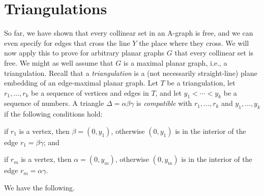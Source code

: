\section{Triangulations}



So far, we have shown that every collinear set in an A-graph is free,
and we can even specify  for edges that cross the line $Y$ the place
where they cross.
We will now apply this to prove for arbitrary planar graphs $G$
that every collinear set is free.
We might as well assume that $G$ is a maximal planar graph, i.e., a triangulation.
Recall that a {\em triangulation} is a (not necessarily straight-line) plane embedding of an edge-maximal planar graph. Let $T$ be a triangulation, let $r_1,\ldots,r_k$ be a sequence of vertices and edges in $T$, and let $y_1<\cdots<y_k$ be a sequence of numbers. A triangle $\Delta=\alpha\beta\gamma$ is \emph{compatible} with $r_1,\ldots,r_k$ and $y_1,\ldots,y_k$ if the following conditions hold:
\begin{compactenum}
	\item if $r_1$ is a vertex, then $\beta=(0,y_1)$, otherwise $(0, y_1)$ is in the interior of the edge $r_1=\beta\gamma$; and
	\item if $r_m$ is a vertex, then $\alpha=(0,y_m)$, otherwise $(0,y_m)$ is in the interior
	of the edge $r_m=\alpha\gamma$.
\end{compactenum}


We have the following.

